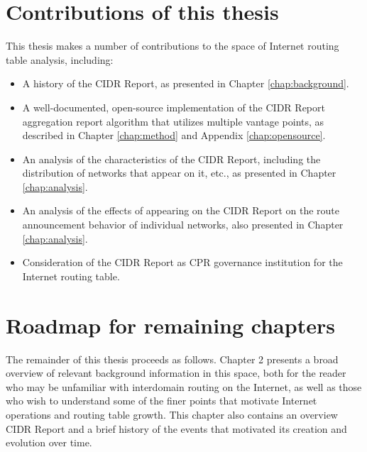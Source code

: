\section{Contributions of this thesis}

This thesis makes a number of contributions to the space of Internet routing
table analysis, including:

\begin{itemize}
    \item{A history of the CIDR Report, as presented in Chapter
    \ref{chap:background}.}
    \item{A well-documented, open-source implementation of the CIDR Report
    aggregation report algorithm that utilizes multiple vantage points, as
    described in Chapter \ref{chap:method} and Appendix \ref{chap:opensource}.}
    \item{An analysis of the characteristics of the CIDR Report, including the
    distribution of networks that appear on it, etc., as presented in Chapter
    \ref{chap:analysis}.}
    \item{An analysis of the effects of appearing on the CIDR Report on the
    route announcement behavior of individual networks, also presented in
    Chapter \ref{chap:analysis}.}
    \item{Consideration of the CIDR Report as CPR governance institution for
    the Internet routing table.}
\end{itemize}

\section{Roadmap for remaining chapters}

The remainder of this thesis proceeds as follows. Chapter 2 presents a broad
overview of relevant background information in this space, both for the reader
who may be unfamiliar with interdomain routing on the Internet, as well as
those who wish to understand some of the finer points that motivate Internet
operations and routing table growth. This chapter also contains an overview
CIDR Report and a brief history of the events that motivated its creation and
evolution over time.

